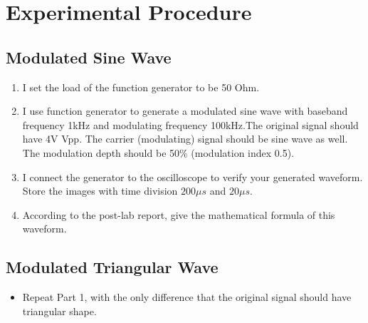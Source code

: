 \documentclass [utf8] {article}
\begin{document}
\section{Experimental Procedure}
{
	\subsection{Modulated Sine Wave}
	{
		\begin{enumerate}
			\item I set the load of the function generator to be 50 Ohm.
			\item I use function generator to generate a modulated sine wave with baseband frequency 1kHz and modulating frequency 100kHz.The original signal should have 4V Vpp. The carrier (modulating) signal should be sine wave as well. The modulation depth should be 50$\%$ (modulation index 0.5).
			\item I connect the generator to the oscilloscope to verify your generated waveform. Store the images with time division $200\mu s$ and $20\mu s$.
			\item According to the post-lab report, give the mathematical formula of this waveform.
		\end{enumerate}
	}
}

\subsection{Modulated Triangular Wave}
{
	\begin{itemize}
		\item Repeat Part 1, with the only difference that the original signal should have triangular shape.
	\end{itemize}
}
\end{document}
